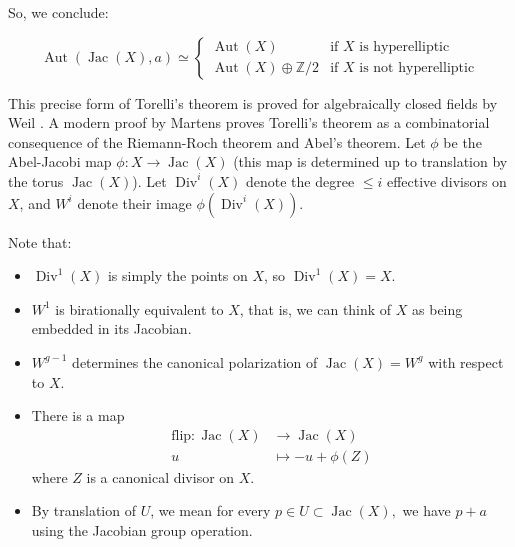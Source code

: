\documentclass[12pt,reqno]{amsart}
\DeclareMathOperator{\Aut}{Aut}
\DeclareMathOperator{\Jac}{Jac}
\DeclareMathOperator{\Div}{Div}
\newcommand{\Z}{\mathbb{Z}}
\theoremstyle{definition}
\theoremstyle{remark}
\newtheorem*{remark}{Remark}
\newcommand{\ti}{\todo[inline]}
\begin{document}
So, we conclude: 

$$\Aut(\Jac(X), a) \simeq \begin{cases} \Aut(X) & \text{if } X \text{ is hyperelliptic} \\
\Aut(X) \oplus \Z/2 &  \text{if } X \text{ is not hyperelliptic}
\end{cases} $$





This precise form of Torelli's theorem is proved for algebraically closed fields by Weil \cite{oe}. A modern proof by Martens \cite{finn} proves Torelli's theorem as a combinatorial consequence of the Riemann-Roch theorem and Abel's theorem. Let $\phi$ be the Abel-Jacobi map $\phi: X \to \Jac(X)$ (this map is determined up to translation by the torus $\Jac(X)$). Let $\Div^i(X)$ denote the degree $\leq i$ effective divisors on $X$, and $W^i$ denote their image $\phi(\Div^i(X))$. 



Note that: 

\begin{itemize} 
\item $\Div^1(X)$ is simply the points on $X$, so  $\Div^1(X) = X$.

\item $W^1$ is birationally equivalent to $X$, that is, we can think of $X$ as being embedded in its Jacobian. 

\item  $W^{g-1}$ determines the canonical polarization of $\Jac(X) = W^g$ with respect to $X$.  

\item There is a map \begin{align*}
\text{flip}: \Jac(X) &\to \Jac(X)\\
u &\mapsto -u + \phi(Z)
\end{align*}
where $Z$ is a canonical divisor on $X$.
\item By translation of $U$, we mean for every $p \in U \subset \Jac(X),$ we have $p+a$ using the Jacobian group operation.
\end{itemize} 
\end{document}
